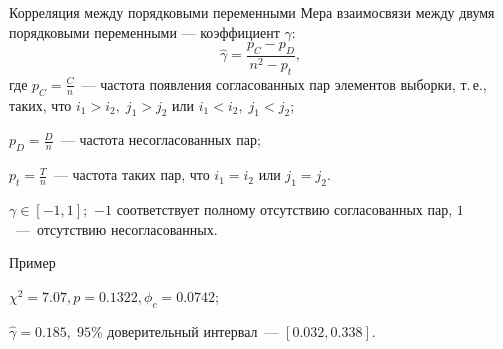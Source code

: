 \documentclass[9pt,pdf,utf8,hyperref={unicode},aspectratio=169]{beamer}
\begin{document}
\begin{frame}{Корреляция между порядковыми переменными}
	Мера взаимосвязи между двумя порядковыми переменными --- коэффициент $\gamma$:
	$$\hat{\gamma} = \frac{p_C-p_D}{n^2-p_t},$$
	где $p_C = \frac{C}{n}$~--- частота появления согласованных пар элементов выборки, т.\,е., таких, что $i_1>i_2, \; j_1>j_2$ или $i_1<i_2, \; j_1<j_2$;
	 		
	$p_D=\frac{D}{n}$~--- частота несогласованных пар;
	
	$p_t = \frac{T}{n}$~--- частота таких пар, что $i_1=i_2$ или $j_1=j_2$.
	
	$\gamma \in [-1,1];$ $-1$ соответствует полному отсутствию согласованных пар, $1$~---~отсутствию несогласованных.
\end{frame}
\begin{frame}	
\begin{block}{Пример}
	\begin{table}[h]
		\centering
	\end{table}
\end{block}
	
	\vspace{5pt}
	
	$\chi^2 = 7.07, p = 0.1322, \phi_c = 0.0742;$	
	
	$\hat{\gamma} = 0.185, \; 95$\% доверительный интервал~--- $\left[0.032, 0.338\right].$
	
\end{frame}
\end{document}
